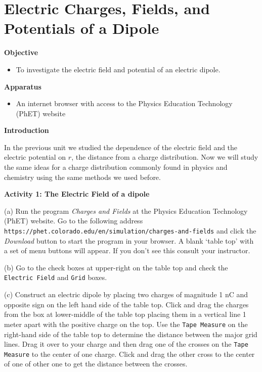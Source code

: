 
\section{Electric Charges, Fields, and Potentials of a Dipole}

\makelabheader %

\textbf{Objective}

\begin{itemize}
\item To investigate the electric field and potential of an electric dipole.
\end{itemize}

\textbf{Apparatus}

\begin{itemize}
\item An internet browser with access to the Physics Education Technology (PhET) website
\end{itemize}

\textbf{Introduction}

In the previous unit we studied the dependence
of the electric field and the electric potential on $r$, the distance from
a charge distribution.
Now we will study the same ideas for a charge distribution commonly found in physics and chemistry
using the same methods we used before.

\textbf{Activity 1: The Electric Field of a dipole}

(a) Run the program {\it Charges and Fields} at the Physics Education Technology (PhET)
website. Go to the following address {\tt https://phet.colorado.edu/en/simulation/charges-and-fields}
and click the {\it Download} button to start the program in your browser.
A blank `table top' with a set of menu buttons will appear. 
If you don't see this consult your instructor.

(b) Go to the check boxes at upper-right on the table top and check the {\tt Electric Field}
and {\tt Grid} boxes.

(c) Construct an electric dipole by placing two charges of magnitude 1 nC and opposite sign
on the left hand side of the table top.
Click and drag the charges 
from the box at lower-middle of the table top placing them in a vertical 
line 1 meter apart with the positive charge on the top. 
Use the {\tt Tape Measure} on the right-hand side of the table top
to determine the distance between the major grid lines.
Drag it over to your charge and then 
drag one of the crosses on the {\tt Tape Measure} to the center of one charge.
Click and drag the other cross to the center of one of other one to get
the distance between the crosses.

